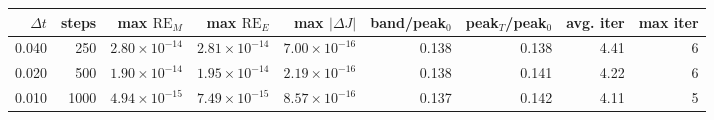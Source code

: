 \begin{tabular}{rrrrrrrrr}
\toprule
$\Delta t$ & steps & max $\mathrm{RE}_M$ & max $\mathrm{RE}_E$ & max $|\Delta J|$ & band/peak$_0$ & peak$_T$/peak$_0$ & avg. iter & max iter \\
\midrule
0.040 & 250 & \(2.80\times10^{-14}\) & \(2.81\times10^{-14}\) & \(7.00\times10^{-16}\) & 0.138 & 0.138 & 4.41 & 6 \\
0.020 & 500 & \(1.90\times10^{-14}\) & \(1.95\times10^{-14}\) & \(2.19\times10^{-16}\) & 0.138 & 0.141 & 4.22 & 6 \\
0.010 & 1000 & \(4.94\times10^{-15}\) & \(7.49\times10^{-15}\) & \(8.57\times10^{-16}\) & 0.137 & 0.142 & 4.11 & 5 \\
\bottomrule
\end{tabular}
